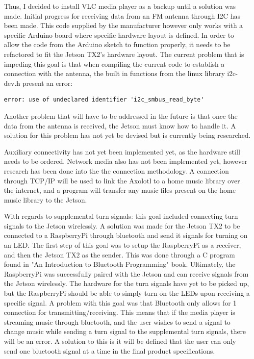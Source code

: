 \documentclass[onecolumn, draftclsnofoot,10pt, compsoc]{IEEEtran}
\begin{document}
Thus, I decided to install VLC media player as a backup until a solution was made. Initial progress for receiving data from an FM antenna through I2C has been made. This code supplied by the manufacturer however only works with a specific Arduino board where specific hardware layout is defined. In order to allow the code from the Arduino sketch to function properly, it needs to be refactored to fit the Jetson TX2's hardware layout. The current problem that is impeding this goal is that when compiling the current code to establish a connection with the antenna, the built in functions from the  linux library i2c-dev.h present an error:
\begin{verbatim}
error: use of undeclared identifier 'i2c_smbus_read_byte'
\end{verbatim}
Another problem that will have to be addressed in the future is that once the data from the antenna is received, the Jetson must know how to handle it. A solution for this problem has not yet be devised but is currently being researched.\par

Auxiliary connectivity has not yet been implemented yet, as the hardware still needs to be ordered. Network media also has not been implemented yet, however research has been done into the the connection methodology. A connection through TCP/IP will be used to link the Axolotl to a home music library over the internet, and a program will transfer any music files present on the home music library to the Jetson.\par

With regards to supplemental turn signals: this goal included connecting turn signals to the Jetson wirelessly. A solution was made for the Jetson TX2 to be connected to a RaspberryPi through bluetooth and send it signals for turning on an LED. The first step of this goal was to setup the RaspberryPi as a receiver, and then the Jetson TX2 as the sender. This was done through a C program found in "An Introduction to Bluetooth Programming" book. Ultimately, the RaspberryPi was successfully paired with the Jetson and can receive signals from the Jetson wirelessly. The hardware for the turn signals have yet to be picked up, but the RaspberryPi should be able to simply turn on the LEDs upon receiving a specific signal. A problem with this goal was that Bluetooth only allows for 1 connection for transmitting/receiving. This means that if the media player is streaming music through bluetooth, and the user wishes to send a signal to change music while sending a turn signal to the supplemental turn signals, there will be an error. A solution to this is it will be defined that the user can only send one bluetooth signal at a time in the final product specifications.
\end{document}
